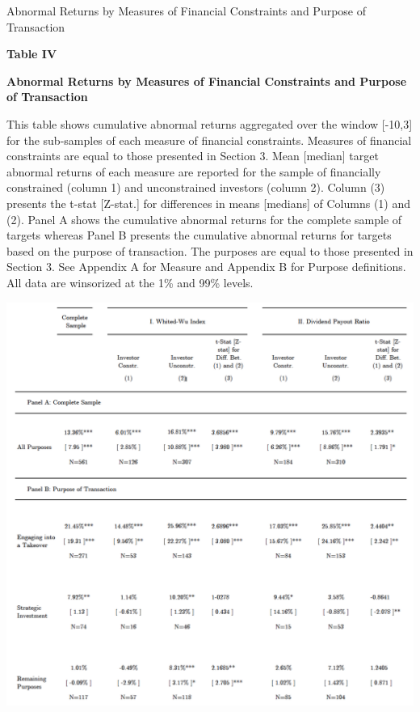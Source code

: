 \documentclass[12pt]{article}
\begin{document}
\begin{table}[!htbp]
	\centering
	\captionsetup{textformat=empty,labelformat=blank}
	\caption{Abnormal Returns by Measures of Financial Constraints and Purpose of Transaction}
	\textbf{Table IV}\par\medskip
	\large\textbf{Abnormal Returns by Measures of Financial Constraints and Purpose of Transaction}\par\medskip
	\justifying
	\footnotesize\noindent{}This table shows cumulative abnormal returns aggregated over the window [-10,3] for the sub-samples of each measure of financial constraints. Measures of financial constraints are equal to those presented in Section 3. Mean [median] target abnormal returns of each measure are reported for the sample of financially constrained (column 1) and unconstrained investors (column 2). Column (3) presents the t-stat [Z-stat.] for differences in means [medians] of Columns (1) and (2). Panel A shows the cumulative abnormal returns for the complete sample of targets whereas Panel B presents the cumulative abnormal returns for targets based on the purpose of transaction. The purposes are equal to those presented in Section 3. See Appendix A for Measure and Appendix B for Purpose definitions. All data are winsorized at the 1\% and 99\% levels.\par\medskip
	\centering													
	\begin{adjustbox}{width=\textwidth}
		\includegraphics{Measures1}
	\end{adjustbox}\par\medskip
\end{table}
\end{document}
